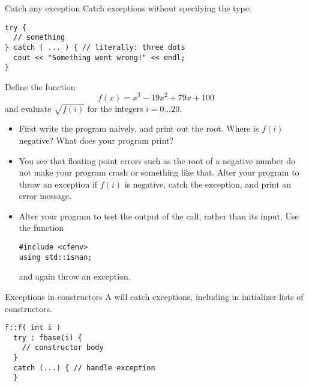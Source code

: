 \begin{block}{Catch any exception}
  \label{sl:exception-catchall}
  Catch exceptions without specifying the type:
\begin{verbatim}
try {
  // something
} catch ( ... ) { // literally: three dots
  cout << "Something went wrong!" << endl;
}
\end{verbatim}
\end{block}

\begin{exercise}
  \label{ex:throw-negroot}
  Define the function \[ f(x)=x^3-19x^2+79x+100 \] and evaluate
  $\sqrt{f(i)}$ for the integers $i=0\ldots20$.
  \begin{itemize}
  \item First write the program naively, and print out the root. Where is
    $f(i)$ negative? What does your program print?
  \item You see that floating point errors such as the root of a negative number
    do not make your program crash or
    something like that. Alter your program to throw an exception if
    $f(i)$ is negative, catch the exception, and print an error
    message.
  \item Alter your program to test the output of the  call,
    rather than its input.
    Use the function 
\begin{verbatim}
#include <cfenv>
using std::isnan;  
\end{verbatim}
    and again throw an exception.
  \end{itemize}
\end{exercise}

\begin{block}{Exceptions in constructors}
  \label{sl:except-construct}
  A  will catch exceptions,
    including in initializer lists of constructors.
\begin{verbatim}
f::f( int i ) 
  try : fbase(i) {
    // constructor body
  }
  catch (...) { // handle exception
  }
\end{verbatim}
\end{block}

